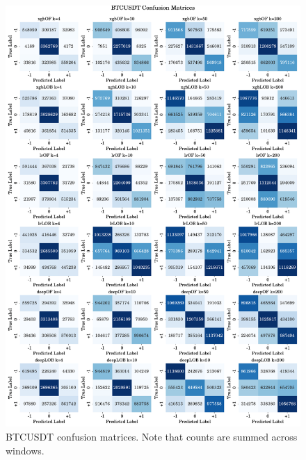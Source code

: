 \begin{figure}[htpb!]
    \centering
    \includegraphics[width=1.0\textwidth]{./images/BTCUSDT_confusion_matrices.pdf}
    \caption{BTCUSDT confusion matrices. Note that counts are summed across windows.}
    \label{BTCUSDT_cm}
\end{figure}

